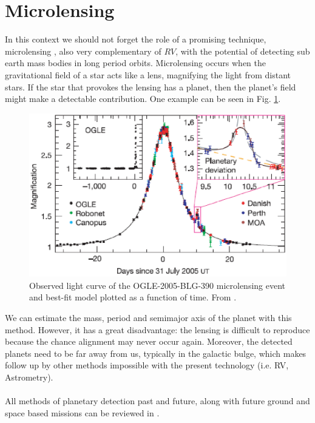 \documentclass[dvips,12pt,a4paper]{report}
\begin{document}
\section{Microlensing} 
\label{microlens}
\indent In this context we should not forget the role of a promising technique, microlensing \citep{Beaulieu-2006}, also very complementary of $RV$, with the potential of detecting sub earth mass bodies in long period orbits. Microlensing occurs when the gravitational field of a star acts like a lens, magnifying the light from distant stars. If the star that provokes the lensing has a planet, then the planet's field might make a detectable contribution. One example can be seen in Fig. \ref{microlensfig}. 
\begin{figure}[h]
\centering
\includegraphics[trim=0cm 0.5cm 0cm 0.5cm,clip,height=5 cm]{pics/microlensing2}
\caption[Example of a microlensing event]{Observed light curve of the OGLE-2005-BLG-390 microlensing event and best-fit model plotted as a function of time. From \citet{Beaulieu-2006}.}
\label{microlensfig}
\end{figure}

We can estimate the mass, period and semimajor axis of the planet with this method. However, it has a great disadvantage: the lensing is difficult to reproduce because the chance alignment may never occur again. Moreover, the detected planets need to be far away from us, typically in the galactic bulge, which makes follow up by other methods impossible with the present technology (i.e. RV, Astrometry).
\\
\\
All methods of planetary detection past and future, along with future ground and space based missions can be reviewed in \citet{Perryman-2005}.



\end{document}
